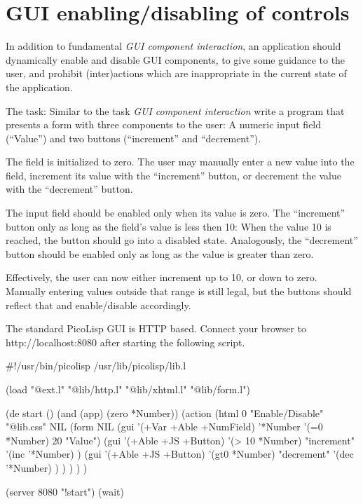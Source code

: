 \pagebreak{}
\section*{GUI enabling/disabling of controls}

In addition to fundamental \emph{GUI component interaction}, an
application should dynamically enable and disable GUI components, to
give some guidance to the user, and prohibit (inter)actions which are
inappropriate in the current state of the application.

The task: Similar to the task \emph{GUI component interaction} write a
program that presents a form with three components to the user: A
numeric input field (``Value'') and two buttons (``increment'' and
``decrement'').

The field is initialized to zero. The user may manually enter a new
value into the field, increment its value with the ``increment'' button,
or decrement the value with the ``decrement'' button.

The input field should be enabled only when its value is zero. The
``increment'' button only as long as the field's value is less then 10:
When the value 10 is reached, the button should go into a disabled
state. Analogously, the ``decrement'' button should be enabled only as
long as the value is greater than zero.

Effectively, the user can now either increment up to 10, or down to
zero. Manually entering values outside that range is still legal, but
the buttons should reflect that and enable/disable accordingly.


\begin{wideverbatim}

The standard PicoLisp GUI is HTTP based. Connect your browser to
http://localhost:8080 after starting the following script.

#!/usr/bin/picolisp /usr/lib/picolisp/lib.l

(load "@ext.l" "@lib/http.l" "@lib/xhtml.l" "@lib/form.l")

(de start ()
   (and (app) (zero *Number))
   (action
      (html 0 "Enable/Disable" "@lib.css" NIL
         (form NIL
            (gui '(+Var +Able +NumField) '*Number '(=0 *Number) 20 "Value")
            (gui '(+Able +JS +Button) '(> 10 *Number) "increment"
               '(inc '*Number) )
            (gui '(+Able +JS +Button) '(gt0 *Number) "decrement"
               '(dec '*Number) ) ) ) ) )

(server 8080 "!start")
(wait)

\end{wideverbatim}


